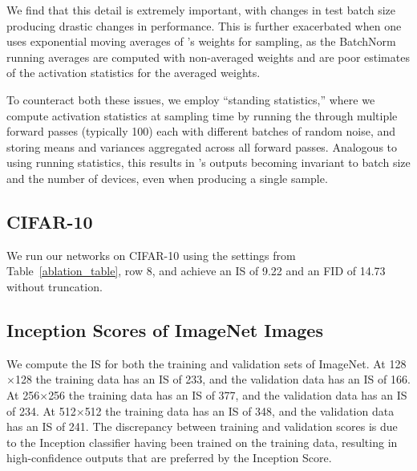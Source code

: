We find that this detail is extremely important, with changes in test batch size producing drastic changes in performance. This is further exacerbated when one uses exponential moving averages of \gen{}'s weights for sampling, as the BatchNorm running averages are computed with non-averaged weights and are poor estimates of the activation statistics for the averaged weights.

To counteract both these issues, we employ ``standing statistics,'' where we compute activation statistics at sampling time by running the \gen{} through multiple forward passes (typically 100) each with different batches of random noise, and storing means and variances aggregated across all forward passes. Analogous to using running statistics, this results in \gen{}'s outputs becoming invariant to batch size and the number of devices, even when producing a single sample.

\subsection{CIFAR-10}
We run our networks on CIFAR-10 \citep{krizhevsky2009cifar} using the settings from Table~\ref{ablation_table}, row 8, and achieve an IS of 9.22 and an FID of 14.73 without truncation.

\subsection{Inception Scores of ImageNet Images}
We compute the IS for both the training and validation sets of ImageNet. At 128$\times$128 the training data has an IS of 233, and the validation data has an IS of 166. At 256$\times$256 the training data has an IS of 377, and the validation data has an IS of 234. At 512$\times$512 the training data has an IS of 348, and the validation data has an IS of 241. The discrepancy between training and validation scores is due to the Inception classifier having been trained on the training data, resulting in high-confidence outputs that are preferred by the Inception Score.